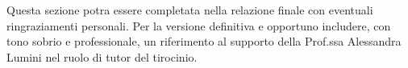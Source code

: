 
Questa sezione potra essere completata nella relazione finale con eventuali ringraziamenti personali. Per la versione definitiva e opportuno includere, con tono sobrio e professionale, un riferimento al supporto della Prof.ssa Alessandra Lumini nel ruolo di tutor del tirocinio.
